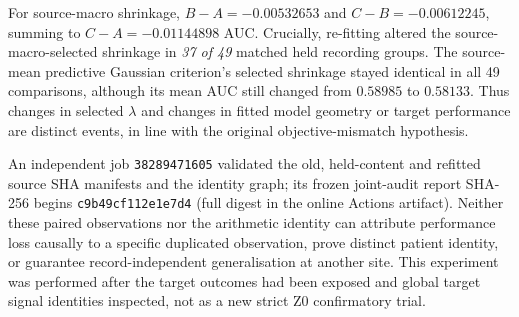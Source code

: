 For source-macro shrinkage, $B-A=-0.00532653$
and $C-B=-0.00612245$, summing to
$C-A=-0.01144898$ AUC. Crucially, re-fitting
altered the source-macro-selected shrinkage
in \emph{37 of 49} matched held recording groups.
The source-mean predictive Gaussian criterion's
selected shrinkage stayed identical in all
49 comparisons, although its mean AUC still
changed from $0.58985$ to $0.58133$.
Thus changes in selected $\lambda$ and
changes in fitted model geometry or target
performance are distinct events, in line
with the original objective-mismatch hypothesis.

An independent job \texttt{38289471605}
validated the old, held-content and refitted
source SHA manifests and the identity graph;
its frozen joint-audit report SHA-256 begins
\texttt{c9b49cf112e1e7d4} (full digest
in the online Actions artifact).
Neither these paired observations nor the
arithmetic identity can attribute performance
loss causally to a specific duplicated observation,
prove distinct patient identity, or guarantee
record-independent generalisation at another site.
This experiment was performed after the
target outcomes had been exposed and global
target signal identities inspected, not as
a new strict Z0 confirmatory trial.
